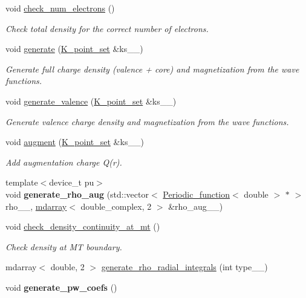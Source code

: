 \begin{DoxyCompactItemize}
\item 
void \hyperlink{classsirius_1_1_density_a08873d1e06c8e075733bcea760e83eef}{check\+\_\+num\+\_\+electrons} ()
\begin{DoxyCompactList}\small\item\em Check total density for the correct number of electrons. \end{DoxyCompactList}\item 
void \hyperlink{classsirius_1_1_density_a60a7e07923f2ddd22d64f49b787ceb40}{generate} (\hyperlink{classsirius_1_1_k__point__set}{K\+\_\+point\+\_\+set} \&ks\+\_\+\+\_\+)
\begin{DoxyCompactList}\small\item\em Generate full charge density (valence + core) and magnetization from the wave functions. \end{DoxyCompactList}\item 
void \hyperlink{classsirius_1_1_density_aba34655a6e88da666ae30c6c464e5034}{generate\+\_\+valence} (\hyperlink{classsirius_1_1_k__point__set}{K\+\_\+point\+\_\+set} \&ks\+\_\+\+\_\+)
\begin{DoxyCompactList}\small\item\em Generate valence charge density and magnetization from the wave functions. \end{DoxyCompactList}\item 
void \hyperlink{classsirius_1_1_density_ab24421e0c72f7eb03c9ccd4006673e9f}{augment} (\hyperlink{classsirius_1_1_k__point__set}{K\+\_\+point\+\_\+set} \&ks\+\_\+\+\_\+)
\begin{DoxyCompactList}\small\item\em Add augmentation charge Q(r). \end{DoxyCompactList}\item 
\hypertarget{classsirius_1_1_density_a4b9e362da740a726f5772f85c273345d}{}{\footnotesize template$<$device\+\_\+t pu$>$ }\\void {\bfseries generate\+\_\+rho\+\_\+aug} (std\+::vector$<$ \hyperlink{classsirius_1_1_periodic__function}{Periodic\+\_\+function}$<$ double $>$ $\ast$ $>$ rho\+\_\+\+\_\+, \hyperlink{classsddk_1_1mdarray}{mdarray}$<$ double\+\_\+complex, 2 $>$ \&rho\+\_\+aug\+\_\+\+\_\+)\label{classsirius_1_1_density_a4b9e362da740a726f5772f85c273345d}

\item 
void \hyperlink{classsirius_1_1_density_aba49bccd299f66e8673c5930c46f2972}{check\+\_\+density\+\_\+continuity\+\_\+at\+\_\+mt} ()
\begin{DoxyCompactList}\small\item\em Check density at M\+T boundary. \end{DoxyCompactList}\item 
mdarray$<$ double, 2 $>$ \hyperlink{classsirius_1_1_density_a9ee8dd1f86a1e710556b80bed374f928}{generate\+\_\+rho\+\_\+radial\+\_\+integrals} (int type\+\_\+\+\_\+)
\item 
\hypertarget{classsirius_1_1_density_a5608b9fede80d568ec809d40052a98f7}{}void {\bfseries generate\+\_\+pw\+\_\+coefs} ()\label{classsirius_1_1_density_a5608b9fede80d568ec809d40052a98f7}


\end{DoxyCompactItemize}
